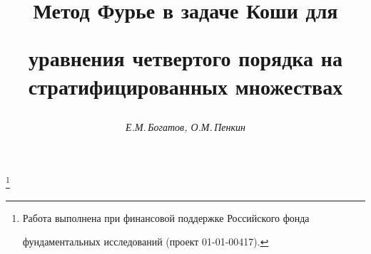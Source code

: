 

 




\newcommand{\la}{\langle} 


\newcommand{\ra}{\rangle} 


\newcommand{\tts}[1]{}  


 


 




\setcounter{page}{67} 












 


\author{\it Е.М.\,Богатов, О.М.\,Пенкин} 




\title{Метод Фурье в задаче Коши для 


уравнения четвертого порядка на стратифицированных множествах} 


\thanks{Работа выполнена при финансовой поддержке Российского фонда 


фундаментальных исследований (проект 01-01-00417).} 


 


\date{} 




\pagestyle{plain} %


 




\maketitle 


